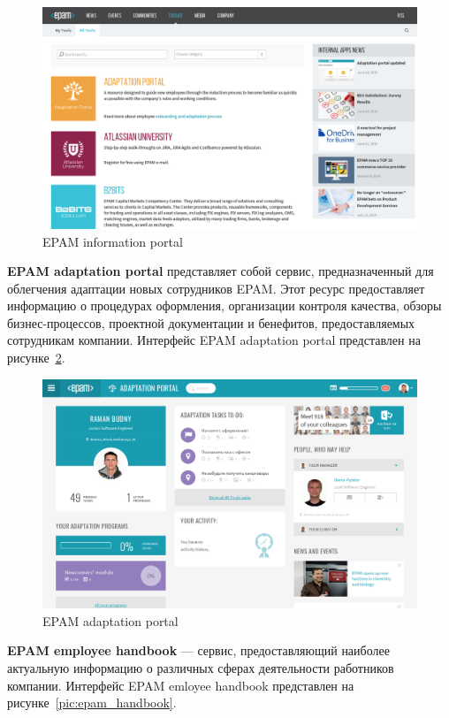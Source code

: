 \begin{figure}[h!]
  \centering
  \includegraphics[width=130mm]{fig/epam_info.png}
  \caption{EPAM information portal}
  \label{pic:epam_info}
\end{figure}

\textbf{EPAM adaptation portal} представляет собой сервис, предназначенный для
облегчения адаптации новых сотрудников EPAM.
Этот ресурс предоставляет информацию о процедурах оформления,
организации контроля качества, обзоры бизнес-процессов,
проектной документации и бенефитов, предоставляемых сотрудникам компании.
Интерфейс EPAM adaptation portal представлен на рисунке~\ref{pic:epam_adaptation}.

\begin{figure}[h!]
  \centering
  \includegraphics[width=130mm]{fig/epam_adaptation.png}
  \caption{EPAM adaptation portal}
  \label{pic:epam_adaptation}
\end{figure}

\textbf{EPAM employee handbook} --- сервис, предоставляющий наиболее актуальную
информацию о различных сферах деятельности работников компании.
Интерфейс EPAM emloyee handbook представлен на рисунке~\ref{pic:epam_handbook}.

